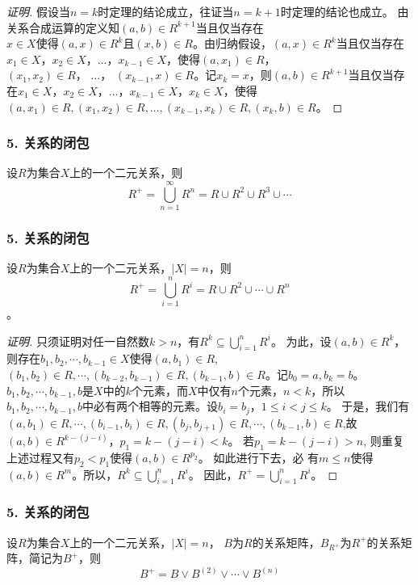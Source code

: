 \documentclass{beamer}
\begin{document}
\begin{CJK*}{UTF8}{gbsn}
\begin{frame}
\begin{proof}[证明]
  \pause 假设当$n=k$时定理的结论成立，往证当$n=k+1$时定理的结论也成立。
  \pause 由关系合成运算的定义知$(a,b)\in R^{k+1}$当且仅当存在\\$x\in X$使得$(a,x)\in R^k$且$(x, b)\in R$。\pause 由归纳假设，$(a,x)\in R^k$当且仅当存在$x_1\in X$，$x_2\in X$，$\ldots$，$x_{k-1}\in X$，使得$(a, x_1) \in R$，\\ $(x_1, x_2)\in R$，  $\ldots$， $(x_{k-1}, x)\in R$。\pause 记$x_{k}=x$，则$(a,b)\in R^{k+1}$当且仅当存在$x_1\in X$，$x_2\in X$，$\ldots$，$x_{k-1}\in X$，$x_{k}\in X$，使得\\$(a, x_1) \in R,(x_1, x_2)\in R,\ldots,(x_{k-1}, x_k)\in R,(x_k, b)\in R$。
\end{proof}

\end{frame}
\begin{frame}
  \frametitle{5. 关系的闭包}
  \begin{Thm}
    设$R$为集合$X$上的一个二元关系，则
    \begin{equation*}
      R^+ = \bigcup_{n=1}^\infty R^n = R \cup R^2 \cup R^3 \cup \cdots 
    \end{equation*}
  \end{Thm}
\end{frame}
\begin{frame}
  \frametitle{5. 关系的闭包}
  \begin{Thm}
    设$R$为集合$X$上的一个二元关系，$|X| = n$，则\[R^+ = \bigcup_{i=1}^nR^i = R \cup R^2  \cup \cdots \cup R^n \]。
  \end{Thm}
  \begin{proof}[证明]\justifying\let\raggedright\justifying\small{
      只须证明对任一自然数$k > n$，有$R^k \subseteq \bigcup_{i=1}^nR^i$。\pause
      为此，设$(a,b) \in R^k$，则存在$b_1, b_2, \cdots, b_{k-1} \in
      X$使得$(a,b_1) \in R$, $(b_1, b_2) \in R, \cdots, (b_{k-2}, b_{k-1})\in R,
      (b_{k-1}, b) \in R$。记$b_0 = a, b_k = b$。 \pause $b_1,b_2, \cdots,
      b_{k-1}, b$是$X$中的$k$个元素，而$X$中仅有$n$个元素，$n < k$，所以$b_1,
      b_2, \cdots, b_{k-1}, b$中必有两个相等的元素。设$b_i=b_j$，$1 \leq i < j
      \leq k$。 \pause 于是，我们有$(a,b_1)\in R, \cdots, (b_{i-1}, b_i)\in R,
      (b_j, b_{j+1})\in R, \cdots, (b_{k-1},b)\in R$,故$(a,b)\in
      R^{k-(j-i)}$，$p_1=k-(j-i) < k$。 \pause 若$p_1 = k - (j - i) > n$, 则重复
      上述过程又有$p_2 < p_1$使得$(a,b) \in R^{p_2}$。 \pause 如此进行下去，必
      有$m \leq n$使得$(a,b) \in R^m$。所以，$R^k \subseteq
      \bigcup_{i=1}^nR^i$。 \pause 因此，$R^+=\bigcup_{i=1}^nR^i$。}
  \end{proof}
\end{frame}
\begin{frame}
  \frametitle{5. 关系的闭包}
  \begin{Thm}
    设$R$为集合$X$上的一个二元关系，$|X| = n$， $B$为$R$的关系矩阵，$B_{R^+}$为$R^+$的关系矩阵，简记为$B^+$，则
    \begin{equation*}
      B^+ = B \lor B^{(2)} \lor \cdots \lor B^{(n)}
    \end{equation*}
  \end{Thm}
\end{frame}


\end{CJK*}
\end{document}
